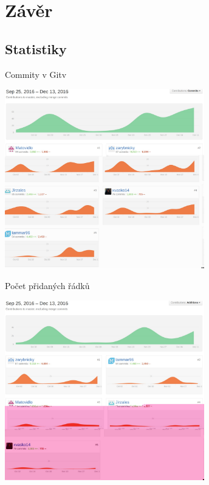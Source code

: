 \documentclass[13pt]{beamer}
\begin{document}
\section{Závěr}
\subsection{Statistiky}
\begin{frame}{Commity v Gitv}
  \begin{center}
    \includegraphics[width=0.65\textwidth]{./img/git_commit.pdf}
  \end{center}
\end{frame}

\begin{frame}{Počet přidaných řádků}
  \begin{center}
    \includegraphics[width=0.65\textwidth]{./img/git_additions.pdf}
  \end{center}
\end{frame}
\end{document}
